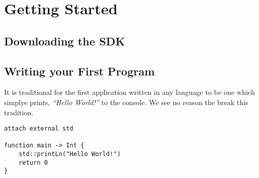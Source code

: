 \hypertarget{getting-started}{%
\section{Getting Started}\label{getting-started}}

\hypertarget{downloading-the-sdk}{%
\subsection{Downloading the SDK}\label{downloading-the-sdk}}

\hypertarget{writing-your-first-program}{%
\subsection{Writing your First
Program}\label{writing-your-first-program}}

It is traditional for the first application written in any language to
be one which simplye prints, \emph{``Hello World!''} to the console. We
see no reason the break this tradition.

\begin{verbatim}
attach external std

function main -> Int {
    std::printLn("Hello World!")
    return 0 
}
\end{verbatim}
